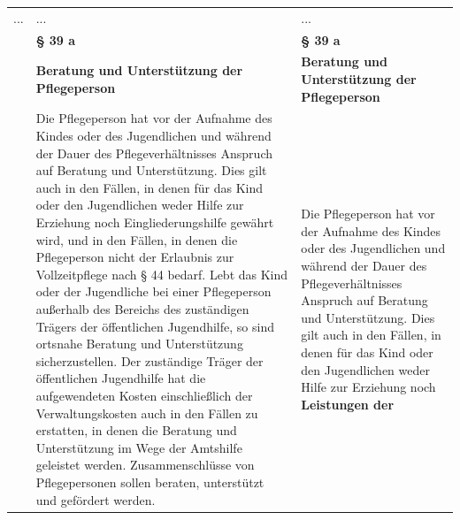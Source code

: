 \documentclass[10pt,a4paper,landscape]{article}
\begin{document}
\begin{longtable}{|L{8.2cm}|L{8.2cm}|L{8.2cm}|}
\hhline{|---|}
... & ... & ... \\
\hhline{|---|}
 & \textbf{\S{} 39 a} & \textbf{\S{} 39 a} \\
\hhline{|---|}
 & \textbf{Beratung und Unterstützung der  \newline Pflegeperson } & \textbf{Beratung und Unterstützung der  \newline Pflegeperson } \\
\hhline{|---|}
 & Die Pflegeperson hat vor der Aufnahme  \newline des Kindes oder des Jugendlichen und  \newline während der Dauer des  \newline Pflegeverhältnisses Anspruch auf Beratung  \newline und Unterstützung. Dies gilt auch in den  \newline Fällen, in denen für das Kind oder den  \newline Jugendlichen weder Hilfe zur Erziehung  \newline noch Eingliederungshilfe gewährt \textcolor{diffred}{wird,} und  \newline in den Fällen, in denen die Pflegeperson  \newline nicht der Erlaubnis zur Vollzeitpflege nach  \newline \S{} 44 bedarf. Lebt das Kind oder der  \newline Jugendliche bei einer Pflegeperson  \newline außerhalb des Bereichs des zuständigen  \newline Trägers der öffentlichen Jugendhilfe, so  \newline sind ortsnahe Beratung und Unterstützung  \newline sicherzustellen. Der zuständige Träger der  \newline öffentlichen Jugendhilfe hat die  \newline aufgewendeten Kosten einschließlich der  \newline Verwaltungskosten auch in den Fällen zu  \newline erstatten, in denen die Beratung und  \newline Unterstützung im Wege der Amtshilfe  \newline geleistet werden. Zusammenschlüsse von  \newline Pflegepersonen sollen beraten, unterstützt  \newline und gefördert werden. & Die Pflegeperson hat vor der Aufnahme  \newline des Kindes oder des Jugendlichen und  \newline während der Dauer des  \newline Pflegeverhältnisses Anspruch auf Beratung  \newline und Unterstützung. Dies gilt auch in den  \newline Fällen, in denen für das Kind oder den  \newline Jugendlichen weder Hilfe zur Erziehung  \newline noch \textbf{\textcolor{diffgreen}{Leistungen der}} 
\end{longtable}
\end{document}
